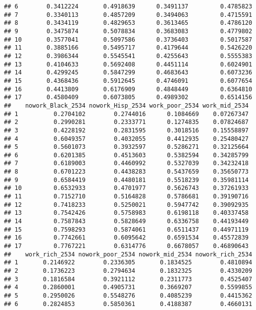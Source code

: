 \documentclass[
]{article}
\begin{document}
\begin{verbatim}
## 6        0.3412224       0.4918639      0.3491137         0.4785823
## 7        0.3340113       0.4857209      0.3494063         0.4715591
## 8        0.3434119       0.4829653      0.3613465         0.4786120
## 9        0.3475874       0.5078834      0.3683083         0.4779802
## 10       0.3577041       0.5097586      0.3736403         0.5017587
## 11       0.3885166       0.5495717      0.4179644         0.5426220
## 12       0.3986344       0.5545541      0.4255643         0.5555383
## 13       0.4104633       0.5692408      0.4451114         0.6024901
## 14       0.4299245       0.5847299      0.4683643         0.6073236
## 15       0.4368436       0.5912645      0.4746091         0.6077654
## 16       0.4413809       0.6176909      0.4848449         0.6364810
## 17       0.4580409       0.6073805      0.4989302         0.6514156
##    nowork_Black_2534 nowork_Hisp_2534 work_poor_2534 work_mid_2534
## 1          0.2704102        0.2744016      0.1084669    0.07267347
## 2          0.2990281        0.2333771      0.1274835    0.07824687
## 3          0.4228192        0.2831595      0.3018516    0.15558897
## 4          0.6049357        0.4032055      0.4412935    0.25480427
## 5          0.5601073        0.3932597      0.5286271    0.32125664
## 6          0.6201385        0.4513603      0.5382594    0.34285799
## 7          0.6189003        0.4460992      0.5327039    0.34232418
## 8          0.6701223        0.4438283      0.5437659    0.35650773
## 9          0.6584419        0.4480181      0.5518239    0.35981114
## 10         0.6532933        0.4701977      0.5626743    0.37261933
## 11         0.7152710        0.5164828      0.5786681    0.39190716
## 12         0.7418233        0.5250021      0.5947742    0.39092935
## 13         0.7542426        0.5758983      0.6198118    0.40337458
## 14         0.7587843        0.5828649      0.6336758    0.44193449
## 15         0.7598293        0.5874061      0.6511437    0.44971119
## 16         0.7742661        0.6095642      0.6591534    0.45572839
## 17         0.7767221        0.6314776      0.6678057    0.46890643
##    work_rich_2534 nowork_poor_2534 nowork_mid_2534 nowork_rich_2534
## 1       0.2146922        0.2336305       0.1834525        0.4810894
## 2       0.1736223        0.2794634       0.1832325        0.4330209
## 3       0.1816584        0.3921112       0.2311773        0.4525407
## 4       0.2860001        0.4905731       0.3669207        0.5599855
## 5       0.2950026        0.5548276       0.4085239        0.4415362
## 6       0.2824853        0.5850361       0.4188387        0.4660131

\end{verbatim}
\end{document}
